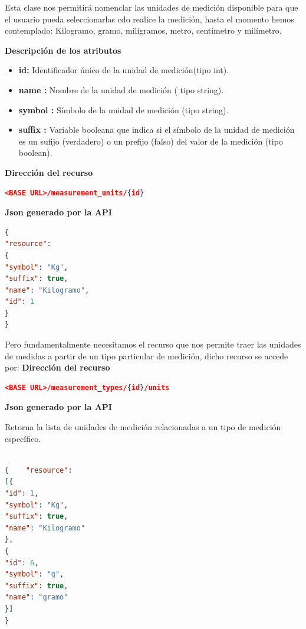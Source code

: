 Esta clase nos permitirá  nomenclar  las unidades de medición disponible para que el usuario pueda seleccionarlas cdo realice la medición, hasta el momento hemos contemplado: Kilogramo, gramo, miligramos, metro, centímetro y milímetro.

\textbf{Descripción de los atributos}
\begin{itemize}
	\item \textbf{id:	}	Identificador único de la unidad de medición(tipo int).
	\item \textbf{name :	}	Nombre de la unidad de medición ( tipo string).
	\item \textbf{symbol :}		Símbolo de la unidad de medición (tipo string).
	\item \textbf{suffix :}	Variable booleana que indica si el símbolo de la unidad de medición es un sufijo (verdadero) o un prefijo (falso) del valor de la medición (tipo boolean).
\end{itemize}

\textbf{Dirección del recurso}
\begin{lstlisting}[language=json,firstnumber=1]
<BASE URL>/measurement_units/{id}
\end{lstlisting}

\textbf{Json generado por la API} 

\begin{lstlisting}[language=json,firstnumber=1]
{
"resource": 
{
"symbol": "Kg",
"suffix": true,
"name": "Kilogramo",
"id": 1
}
}
\end{lstlisting}



Pero fundamentalmente necesitamos el recurso que nos permite traer las unidades de medidas a partir de un tipo particular de medición, dicho recurso se accede por:
\textbf{Dirección del recurso}
\begin{lstlisting}[language=json,firstnumber=1]
<BASE URL>/measurement_types/{id}/units
\end{lstlisting}
\textbf{Json generado por la API} 

Retorna la lista de unidades de medición relacionadas a un tipo de medición específico.
\begin{lstlisting}[language=json, caption=Json generado por la api, label=unitPeso]

{    "resource": 
[{
"id": 1,
"symbol": "Kg",
"suffix": true,
"name": "Kilogramo"
},
{
"id": 6,
"symbol": "g",
"suffix": true,
"name": "gramo"
}]
}
\end{lstlisting}


